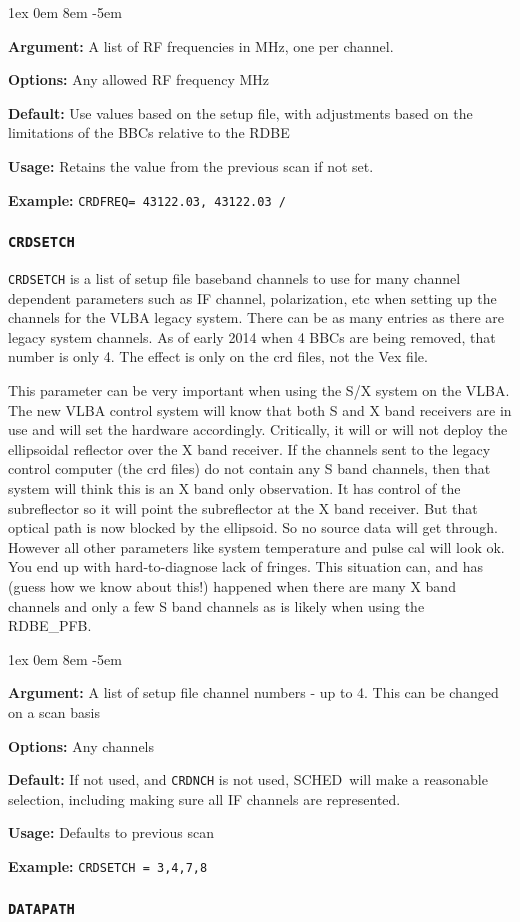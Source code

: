 \documentclass{report}
\newcommand{\schedb}{{\sc SCHED~}}
\newcommand{\rcwbox}[5]{
  \begin{list}{}{\parsep 1ex  \itemsep 0em
                 \leftmargin 8em  \itemindent -5em }
    \item {\bf Argument:} #1
    \item {\bf Options:}  #2
    \item {\bf Default:}  #3
    \item {\bf Usage:}    #4
    \item {\bf Example:}  #5
  \end{list}
}
\begin{document}
\rcwbox
{A list of RF frequencies in MHz, one per channel.}
{Any allowed RF frequency MHz}
{Use values based on the setup file, with adjustments based on the
limitations of the BBCs relative to the RDBE}
{Retains the value from the previous scan if not set.}
{{\tt CRDFREQ= 43122.03, 43122.03 /}}



\subsubsection{\label{MP:CRDSETCH}{\tt CRDSETCH}}

{\tt CRDSETCH} is a list of setup file baseband channels to use for
many channel dependent parameters such as IF channel, polarization,
etc when setting up the channels for the VLBA legacy system.  There
can be as many entries as there are legacy system channels.  As of
early 2014 when 4 BBCs are being removed, that number is only 4.  The
effect is only on the crd files, not the Vex file.

This parameter can be very important when using the S/X system on
the VLBA.  The new VLBA control system will know that both S and X
band receivers are in use and will set the hardware accordingly.  
Critically, it will or will not deploy the ellipsoidal reflector over
the X band receiver.  If the channels sent to the legacy control 
computer (the crd files) do not contain any S band channels, then
that system will think this is an X band only observation.  It has
control of the subreflector so it will point the subreflector at 
the X band receiver.  But that optical path is now blocked by the
ellipsoid.  So no source data will get through.  However all other
parameters like system temperature and pulse cal will look ok.  You
end up with hard-to-diagnose lack of fringes.  This situation can,
and has (guess how we know about this!) happened when there are many
X band channels and only a few S band channels as is likely when
using the RDBE\_PFB.

\rcwbox
{A list of setup file channel numbers - up to 4.  This can be changed
on a scan basis}
{Any channels}
{If not used, and {\tt CRDNCH} is not used, \schedb will make a
reasonable selection, including making sure all IF channels are
represented.}
{Defaults to previous scan}
{{\tt CRDSETCH = 3,4,7,8}}


\subsubsection{\label{MP:DATAPATH}{\tt DATAPATH}}
\end{document}
